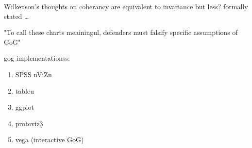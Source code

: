 \documentclass[letterpaper,onecolumn,titlepage]{Ythesis}
\begin{document}
Wilkenson's thoughts on coherancy are equivalent to invariance but less? formally stated \dots

"To call these charts meainingul, defenders must falsify specific assumptions of GoG" \cite{wilkinsonMathematicalFoundationAnalytic2010}


gog implementationss:
\begin{enumerate}
    \item SPSS nViZn
    \item tableu
    \item ggplot
    \item protoviz\d3
    \item vega (interactive GoG)
\end{enumerate}


\printbibliography
\end{document}
